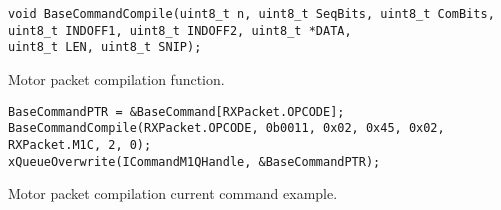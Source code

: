 \begin{listing}[ht]
\begin{verbatim}
void BaseCommandCompile(uint8_t n, uint8_t SeqBits, uint8_t ComBits, 
uint8_t INDOFF1, uint8_t INDOFF2, uint8_t *DATA, 
uint8_t LEN, uint8_t SNIP);
\end{verbatim}
\caption{Motor packet compilation function.}
\label{listing:Motor packet compilation function}
\end{listing}

\begin{listing}[ht]
\begin{verbatim}
BaseCommandPTR = &BaseCommand[RXPacket.OPCODE];
BaseCommandCompile(RXPacket.OPCODE, 0b0011, 0x02, 0x45, 0x02,
RXPacket.M1C, 2, 0);
xQueueOverwrite(ICommandM1QHandle, &BaseCommandPTR);
\end{verbatim}
\caption{Motor packet compilation current command example.}
\label{listing:Motor packet compilation example}
\end{listing}